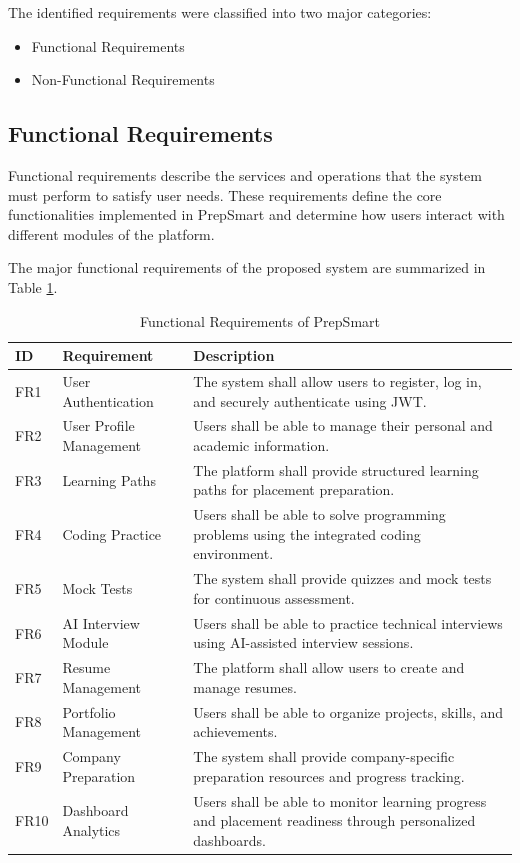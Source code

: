 The identified requirements were classified into two major categories:

\begin{itemize}
    \item Functional Requirements
    \item Non-Functional Requirements
\end{itemize}

\subsection{Functional Requirements}

Functional requirements describe the services and operations that the system must perform to satisfy user needs. These requirements define the core functionalities implemented in PrepSmart and determine how users interact with different modules of the platform.

The major functional requirements of the proposed system are summarized in Table \ref{tab:functional_requirements}.

\begin{table}[H]
\centering
\caption{Functional Requirements of PrepSmart}
\label{tab:functional_requirements}
\renewcommand{\arraystretch}{1.3}
\begin{tabular}{|p{2cm}|p{5cm}|p{7cm}|}
\hline
\textbf{ID} & \textbf{Requirement} & \textbf{Description} \\
\hline
FR1 & User Authentication & The system shall allow users to register, log in, and securely authenticate using JWT. \\
\hline
FR2 & User Profile Management & Users shall be able to manage their personal and academic information. \\
\hline
FR3 & Learning Paths & The platform shall provide structured learning paths for placement preparation. \\
\hline
FR4 & Coding Practice & Users shall be able to solve programming problems using the integrated coding environment. \\
\hline
FR5 & Mock Tests & The system shall provide quizzes and mock tests for continuous assessment. \\
\hline
FR6 & AI Interview Module & Users shall be able to practice technical interviews using AI-assisted interview sessions. \\
\hline
FR7 & Resume Management & The platform shall allow users to create and manage resumes. \\
\hline
FR8 & Portfolio Management & Users shall be able to organize projects, skills, and achievements. \\
\hline
FR9 & Company Preparation & The system shall provide company-specific preparation resources and progress tracking. \\
\hline
FR10 & Dashboard Analytics & Users shall be able to monitor learning progress and placement readiness through personalized dashboards. \\
\hline
\end{tabular}
\end{table}


